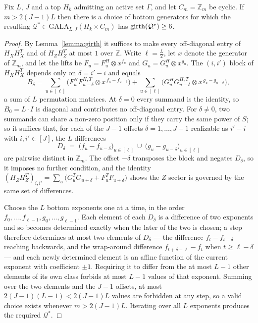 \begin{corollary}\label{cor:girth-m}
Fix $L$, $J$ and a top $H_k$ admitting an active set $\Gamma$, and let $C_m = \mathbb Z_m$ be cyclic. If $m> 2(J-1)L$ then there is a choice of bottom generators for which the resulting $\mathcal{Q}^*\in \mathrm{GALA}_{L,J}(H_k\times C_m)$ has $\mathrm{girth}(\mathcal{Q}^*)\geq 6$.
\end{corollary}

\begin{proof}
By Lemma~\ref{lemma:girth} it suffices to make every off-diagonal entry of $H_XH_X^T$ and of $H_ZH_Z^T$ at most $1$ over $\mathbb Z$. Write $\ell = \tfrac L2$, let $x$ denote the generator of $\mathbb Z_m$, and let the lifts be $F_u = F^H_u\otimes x^{f_u}$ and $G_u = G^H_u\otimes x^{g_u}$. The $(i,i')$ block of $H_XH_X^T$ depends only on $\delta = i'-i$ and equals
\[
    B_\delta = \sum_{u\in[\ell]}\Big(F^H_u F^{H,T}_{u-\delta}\otimes x^{\,f_u-f_{u-\delta}}\Big)
             + \sum_{u\in[\ell]}\Big(G^H_u G^{H,T}_{u-\delta}\otimes x^{\,g_u-g_{u-\delta}}\Big),
\]
a sum of $L$ permutation matrices. At $\delta = 0$ every summand is the identity, so $B_0 = L\cdot I$ is diagonal and contributes no off-diagonal entry. For $\delta\neq0$, two summands can share a non-zero position only if they carry the same power of $S$; so it suffices that, for each of the $J-1$ offsets $\delta = 1,\dots,J-1$ realizable as $i'-i$ with $i,i'\in[J]$, the $L$ differences
\[
    D_\delta \;=\; \big(f_u-f_{u-\delta}\big)_{u\in[\ell]}\ \cup\ \big(g_u-g_{u-\delta}\big)_{u\in[\ell]}
\]
are pairwise distinct in $\mathbb Z_m$. The offset $-\delta$ transposes the block and negates $D_\delta$, so it imposes no further condition, and the identity $(H_ZH_Z^T)_{i,i'} = \sum_u\big(G^T_uG_{u+\delta} + F^T_uF_{u+\delta}\big)$ shows the $Z$ sector is governed by the same set of differences.

Choose the $L$ bottom exponents one at a time, in the order $f_0,\dots,f_{\ell-1},g_0,\dots,g_{\ell-1}$. Each element of each $D_\delta$ is a difference of two exponents and so becomes determined exactly when the later of the two is chosen; a step therefore determines at most two elements of $D_\delta$ --- the difference $f_t - f_{t-\delta}$ reaching backwards, and the wrap-around difference $f_{t+\delta-\ell}-f_t$ when $t\geq\ell-\delta$ --- and each newly determined element is an affine function of the current exponent with coefficient $\pm1$. Requiring it to differ from the at most $L-1$ other elements of its own class forbids at most $L-1$ values of that exponent. Summing over the two elements and the $J-1$ offsets, at most $2(J-1)(L-1) < 2(J-1)L$ values are forbidden at any step, so a valid choice exists whenever $m> 2(J-1)L$. Iterating over all $L$ exponents produces the required $\mathcal Q^*$.
\end{proof}


